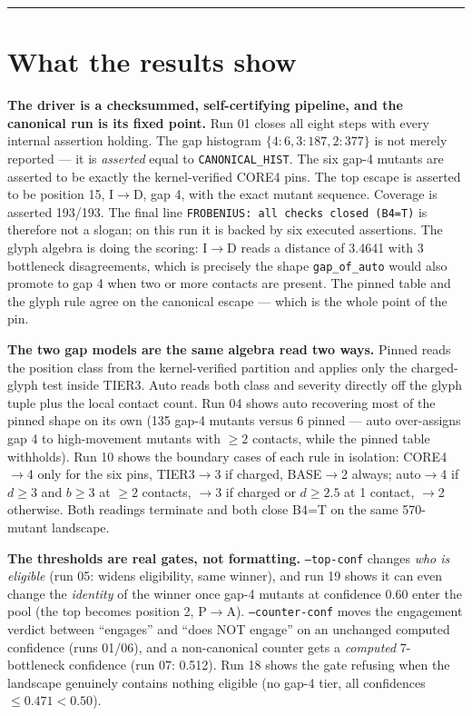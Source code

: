 \documentclass{article}
\begin{document}
\hrule
\section{What the results show}

\textbf{The driver is a checksummed, self-certifying pipeline, and the canonical
run is its fixed point.} Run 01 closes all eight steps with every internal
assertion holding. The gap histogram \(\{4:6, 3:187, 2:377\}\) is not merely
reported --- it is \emph{asserted} equal to \texttt{CANONICAL\_HIST}. The six
gap-4 mutants are asserted to be exactly the kernel-verified CORE4 pins. The top
escape is asserted to be position 15, I\(\to\)D, gap 4, with the exact mutant
sequence. Coverage is asserted 193/193. The final line
\texttt{FROBENIUS: all checks closed (B4=T)} is therefore not a slogan; on this
run it is backed by six executed assertions. The glyph algebra is doing the
scoring: I\(\to\)D reads a distance of 3.4641 with 3 bottleneck disagreements,
which is precisely the shape \texttt{gap\_of\_auto} would also promote to gap 4
when two or more contacts are present. The pinned table and the glyph rule agree
on the canonical escape --- which is the whole point of the pin.

\textbf{The two gap models are the same algebra read two ways.} Pinned reads the
position class from the kernel-verified partition and applies only the
charged-glyph test inside TIER3. Auto reads both class and severity directly off
the glyph tuple plus the local contact count. Run 04 shows auto recovering most
of the pinned shape on its own (135 gap-4 mutants versus 6 pinned --- auto
over-assigns gap 4 to high-movement mutants with \(\geq 2\) contacts, while the
pinned table withholds). Run 10 shows the boundary cases of each rule in
isolation: CORE4\(\to\)4 only for the six pins, TIER3\(\to\)3 if charged,
BASE\(\to\)2 always; auto\(\to\)4 if \(d \geq 3\) and \(b \geq 3\) at \(\geq 2\)
contacts, \(\to\)3 if charged or \(d \geq 2.5\) at 1 contact, \(\to\)2 otherwise.
Both readings terminate and both close B4=T on the same 570-mutant landscape.

\textbf{The thresholds are real gates, not formatting.} \texttt{--top-conf}
changes \emph{who is eligible} (run 05: widens eligibility, same winner), and
run 19 shows it can even change the \emph{identity} of the winner once gap-4
mutants at confidence 0.60 enter the pool (the top becomes position 2,
P\(\to\)A). \texttt{--counter-conf} moves the engagement verdict between
``engages'' and ``does NOT engage'' on an unchanged computed confidence (runs
01/06), and a non-canonical counter gets a \emph{computed} 7-bottleneck
confidence (run 07: 0.512). Run 18 shows the gate refusing when the landscape
genuinely contains nothing eligible (no gap-4 tier, all confidences
\(\leq 0.471 < 0.50\)).
\end{document}

